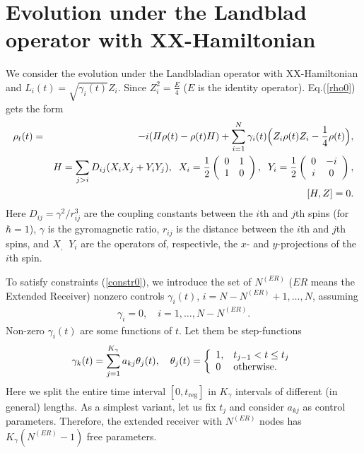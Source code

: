 \documentclass[pra,preprint,showpacs]{revtex4-1}
\begin{document}
\section{Evolution under the Landblad operator with XX-Hamiltonian}
\label{Section:ev}
We consider the evolution under the  Landbladian operator with XX-Hamiltonian and
$L_i(t) = \sqrt{\gamma_i(t)} Z_{i}$. Since $Z_{i}^2=\frac{E}{4}$ ($E$ is the identity operator). Eq.(\ref{rho0}) gets the form
 \begin{eqnarray}\label{rho}
 \rho_t(t)&=&-i (H  \rho(t) - \rho(t) H)+ \sum_{i=1}^N \gamma_i(t)\Big(Z_{i} \rho(t) Z_{i}
-\frac{1}{4} \rho(t) \Big),
\\\nonumber
&&H=\sum_{j>i} D_{ij} (X_{i}X_{j}+Y_{i}Y_{j}  ),\;\;
X_i=\frac{1}{2}\left(\begin{array}{cc}
0&1\cr
1&0
\end{array}\right),\;\;  Y_i=\frac{1}{2}\left(\begin{array}{cc}
0&-i\cr
i&0
\end{array}\right) ,  \\\label{com}
&&[H,Z]=0.
\end{eqnarray}
{Here $D_{ij}=\gamma^2/r_{ij}^3$ are the coupling constants between the $i$th and $j$th spins (for $\hbar=1$), $\gamma$ is the gyromagnetic ratio,
$r_{ij}$  is the distance between the $i$th and $j$th spins}, and {$X_,\;\;Y_i$ are  the operators of, respectivle, the $x$- and $y$-projections of the $i$th spin.}

To satisfy constraints (\ref{constr0}), we introduce  the set of  $N^{(ER)}$ ($ER$ means the Extended Receiver) nonzero controls
$\gamma_i(t)$, $i=N-N^{(ER)}+1, \dots, N$,
assuming
\begin{eqnarray}
\gamma_i=0,\quad  i=1,\dots,N-N^{(ER)}.
\end{eqnarray}
Non-zero $\gamma_i(t)$ are some functions of $t$. Let them be step-functions~\cite{PP_2023}
\begin{eqnarray}\label{LF}
\gamma_k(t) = \sum_{j=1}^{K_\gamma} a_{kj} \theta_j(t),\quad  \theta_j(t) =\left\{\begin{array}{ll}
1, &t_{j-1} < t\le t_j\cr
0  & {\mbox{otherwise}}. \end{array}
\right.
\end{eqnarray}
Here we split the entire time interval
$[0,t_{\mathrm{reg}}]$
in $K_\gamma$ intervals of different (in general) lengths.
As a simplest variant, let us fix $t_j$ and consider  $a_{kj}$ as control parameters.
Therefore, the extended receiver with $N^{(ER)}$ nodes has $K_\gamma(N^{(ER)}-1)$ free parameters.
\end{document}
